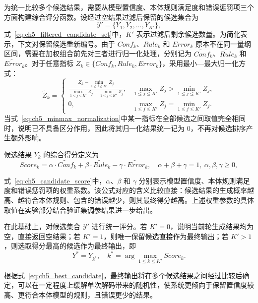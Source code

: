 为统一比较多个候选结果，需要从模型置信度、本体规则满足度和错误惩罚项三个方面构建综合评分函数。设经过空结果过滤后保留的候选集合为
\begin{equation}
\mathcal{Y}'=\{Y_1,Y_2,\dots,Y_{K'}\},
\label{eq:ch5_filtered_candidate_set}
\end{equation}
式~\eqref{eq:ch5_filtered_candidate_set}中，$K'$ 表示过滤后剩余候选数量。为简化表示，下文对保留候选重新编号。由于 $Conf_k$、$Rule_k$ 和 $Error_k$ 原本不在同一量纲区间，需要在加权组合前先对三者进行归一化处理，分别记为 $\widetilde{Conf}_k$、$\widetilde{Rule}_k$ 和 $\widetilde{Error}_k$。对于任意指标 $Z_k \in \{Conf_k, Rule_k, Error_k\}$，采用最小—最大归一化方式：
\begin{equation}
\widetilde{Z}_k=
\begin{cases}
\frac{Z_k-\min_{1\le j\le K'} Z_j}{\max_{1\le j\le K'} Z_j-\min_{1\le j\le K'} Z_j}, & \max_{1\le j\le K'} Z_j>\min_{1\le j\le K'} Z_j, \\
0, & \max_{1\le j\le K'} Z_j=\min_{1\le j\le K'} Z_j.
\end{cases}
\label{eq:ch5_minmax_normalization}
\end{equation}
当式~\eqref{eq:ch5_minmax_normalization}中某一指标在全部候选之间取值完全相同时，说明已不具备区分作用，因此将其归一化结果统一记为 0，不再对候选排序产生额外影响。

候选结果 $Y_k$ 的综合得分定义为
\begin{equation}
Score_k=\alpha \cdot \widetilde{Conf}_k+\beta \cdot \widetilde{Rule}_k-\gamma \cdot \widetilde{Error}_k,
\quad \alpha+\beta+\gamma=1,\ \alpha,\beta,\gamma\ge 0,
\label{eq:ch5_candidate_score}
\end{equation}

式~\eqref{eq:ch5_candidate_score}中，$\alpha$、$\beta$ 和 $\gamma$ 分别表示模型置信度、本体规则满足度和错误惩罚项的权重系数。该公式对应的含义比较直接：候选结果的生成概率越高、越符合本体规则、包含的错误越少，则其最终得分越高。上述权重参数的具体取值在实验部分结合验证集调参结果进一步给出。

在此基础上，对候选集合 $\mathcal{Y}'$ 进行统一评分。若 $K'=0$，说明当前轮生成结果均为空，直接返回空结果；若 $K'=1$，则唯一保留候选直接作为最终输出；若 $K'>1$，则选取得分最高的候选作为最终输出，即
\begin{equation}
Y^{*}=Y_{k^{*}},\quad k^{*}=\arg\max_{1\le k\le K'} Score_k.
\label{eq:ch5_best_candidate}
\end{equation}

根据式~\eqref{eq:ch5_best_candidate}，最终输出将在多个候选结果之间经过比较后确定，可以在一定程度上缓解单次解码带来的随机性，使系统更倾向于保留置信度较高、更符合本体模型的规则，且错误更少的结果。

